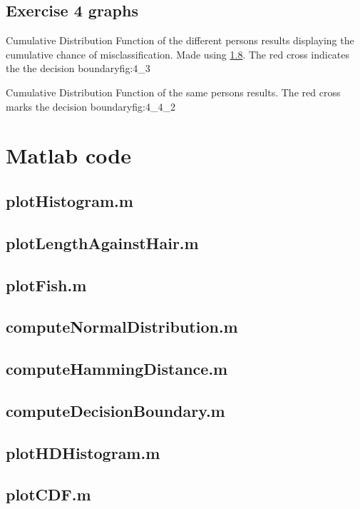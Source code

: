 \documentclass[10pt,a4paper]{article}
\begin{document}
\subsection{Exercise 4 graphs}


{Cumulative Distribution Function of the different persons results displaying the cumulative chance of misclassification. Made using \ref{a:plotCDF}. The red cross indicates the the decision boundary}{fig:4_3}

{Cumulative Distribution Function of the same persons results. The red cross marks the decision boundary}{fig:4_4_2}

\section{Matlab code}
\subsection{plotHistogram.m}\label{a:plotHistogram}

\subsection{plotLengthAgainstHair.m}\label{a:plotLengthAgainstHair}

\subsection{plotFish.m}\label{a:plotFish}

\subsection{computeNormalDistribution.m}\label{a:computeND}

\subsection{computeHammingDistance.m}\label{a:computeHD}

\subsection{computeDecisionBoundary.m}\label{a:computeDB}

\subsection{plotHDHistogram.m}\label{a:plotHDHistogram}

\subsection{plotCDF.m}\label{a:plotCDF}
\end{document}
